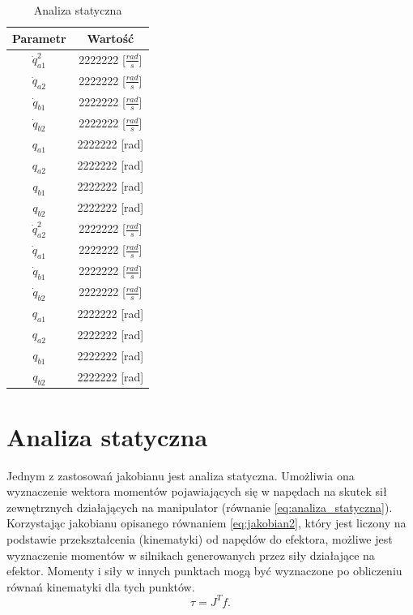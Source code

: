 \documentclass[printmode]{mgr}
\begin{document}
\begin{table}[tp]
  \caption{Analiza statyczna}
  \label{tab:analiza_statyczna}
  \centering
  \begin{tabular}{||c|c||}
    \hline\hline
{\bf Parametr} & {\bf Wartość} \\\hline\hline
$\dot{q}^2_{a1}$ & 2222222 [$\frac{rad}{s}$]\\\hline
$\dot{q}_{a2}$ & 2222222 [$\frac{rad}{s}$]\\
$\dot{q}_{b1}$ & 2222222 [$\frac{rad}{s}$]\\
$\dot{q}_{b2}$ & 2222222 [$\frac{rad}{s}$]\\
$q_{a1}$ & 2222222 [rad]\\
$q_{a2}$ & 2222222 [rad]\\
$q_{b1}$ & 2222222 [rad]\\
$q_{b2}$ & 2222222 [rad]\\\hline\hline
$\dot{q}^2_{a2}$ & 2222222 [$\frac{rad}{s}$]\\\hline
$\dot{q}_{a1}$ & 2222222 [$\frac{rad}{s}$]\\
$\dot{q}_{b1}$ & 2222222 [$\frac{rad}{s}$]\\
$\dot{q}_{b2}$ & 2222222 [$\frac{rad}{s}$]\\
$q_{a1}$ & 2222222 [rad]\\
$q_{a2}$ & 2222222 [rad]\\
$q_{b1}$ & 2222222 [rad]\\
$q_{b2}$ & 2222222 [rad]\\
\hline\hline
  \end{tabular}
\end{table}


\section{Analiza statyczna}\label{sec:analiza_statyczna}
Jednym z zastosowań jakobianu jest analiza statyczna. Umożliwia ona wyznaczenie wektora momentów pojawiających się w napędach
na skutek sił zewnętrznych działających na manipulator (równanie \ref{eq:analiza_statyczna}). 
Korzystając jakobianu opisanego równaniem \eqref{eq:jakobian2}, który jest liczony
na podstawie przekształcenia (kinematyki) od napędów do efektora, możliwe jest wyznaczenie momentów w silnikach generowanych
przez siły działające na efektor. Momenty i siły w innych punktach mogą być wyznaczone po obliczeniu równań kinematyki dla tych punktów.
\begin{equation}
\tau=J^Tf.
\label{eq:analiza_statyczna}
\end{equation}
\end{document}
